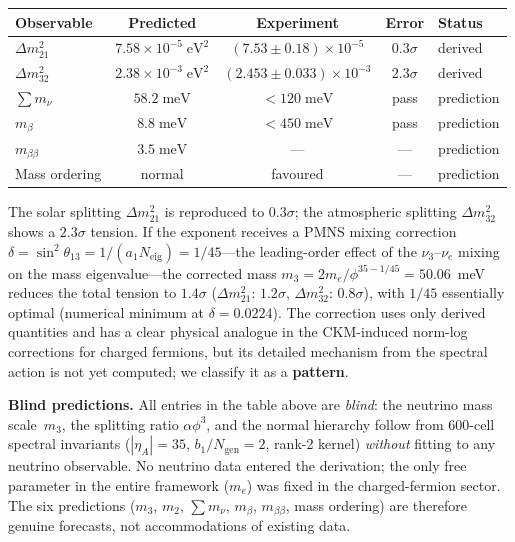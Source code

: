 \documentclass[12pt,a4paper]{article}
\theoremstyle{definition}
\begin{document}
\begin{center}
\begin{tabular}{lcccl}
\toprule
\textbf{Observable} & \textbf{Predicted} & \textbf{Experiment} & \textbf{Error} & \textbf{Status} \\
\midrule
$\Delta m^2_{21}$ & $7.58 \times 10^{-5}\;\text{eV}^2$ & $(7.53 \pm 0.18)\times 10^{-5}$ & $0.3\sigma$ & derived \\
$\Delta m^2_{32}$ & $2.38 \times 10^{-3}\;\text{eV}^2$ & $(2.453 \pm 0.033)\times 10^{-3}$ & $2.3\sigma$ & derived \\
$\sum m_\nu$ & $58.2\;\text{meV}$ & $< 120\;\text{meV}$ & pass & prediction \\
$m_\beta$ & $8.8\;\text{meV}$ & $< 450\;\text{meV}$ & pass & prediction \\
$m_{\beta\beta}$ & $3.5\;\text{meV}$ & --- & --- & prediction \\
Mass ordering & normal & favoured & --- & prediction \\
\bottomrule
\end{tabular}
\end{center}
The solar splitting $\Delta m^2_{21}$ is reproduced to $0.3\sigma$; the atmospheric splitting $\Delta m^2_{32}$ shows a $2.3\sigma$ tension.  If the exponent receives a PMNS mixing correction $\delta = \sin^2\theta_{13} = 1/(a_1 N_{\text{eig}}) = 1/45$---the leading-order effect of the $\nu_3$--$\nu_e$ mixing on the mass eigenvalue---the corrected mass $m_3 = 2m_e/\phi^{35 - 1/45} = 50.06$~meV reduces the total tension to $1.4\sigma$ ($\Delta m^2_{21}$: $1.2\sigma$, $\Delta m^2_{32}$: $0.8\sigma$), with $1/45$ essentially optimal (numerical minimum at $\delta = 0.0224$).  The correction uses only derived quantities and has a clear physical analogue in the CKM-induced norm-log corrections for charged fermions, but its detailed mechanism from the spectral action is not yet computed; we classify it as a \textbf{pattern}.

\textbf{Blind predictions.}  All entries in the table above are \emph{blind}: the neutrino mass scale~$m_3$, the splitting ratio $\alpha\phi^3$, and the normal hierarchy follow from 600-cell spectral invariants ($|\eta_A| = 35$, $b_1/N_{\text{gen}} = 2$, rank-2 kernel) \emph{without} fitting to any neutrino observable.  No neutrino data entered the derivation; the only free parameter in the entire framework ($m_e$) was fixed in the charged-fermion sector.  The six predictions ($m_3$, $m_2$, $\sum m_\nu$, $m_\beta$, $m_{\beta\beta}$, mass ordering) are therefore genuine forecasts, not accommodations of existing data.
\end{document}
